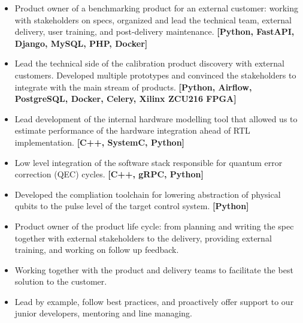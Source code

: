 \documentclass[10pt,a4paper,ragged2e,withhyper]{altacv}
\begin{document}


\begin{itemize}

    \item
    Product owner of a benchmarking product for an external customer:
    working with stakeholders on specs, organized and lead the technical team,
    external delivery, user training, and post-delivery maintenance.
    {\bf [Python, FastAPI, Django, MySQL, PHP, Docker]}
    
    \item
    Lead the technical side of the calibration product discovery with external
    customers.
    Developed multiple prototypes and convinced the stakeholders to integrate
    with the main stream of products.
    {\bf [Python, Airflow, PostgreSQL, Docker, Celery, Xilinx ZCU216 FPGA]}
    
    \item
    Lead development of the internal hardware modelling tool that allowed us
    to estimate performance of the hardware integration ahead of RTL implementation.
    {\bf [C++, SystemC, Python]}

    \item
    Low level integration of the software stack responsible for quantum error
    correction (QEC) cycles.
    {\bf [C++, gRPC, Python]}

    \item
    Developed the compliation toolchain for lowering abstraction of physical
    qubits to the pulse level of the target control system.
    {\bf [Python]}

    \item
    Product owner of the product life cycle: from planning
    and writing the spec together with external stakeholders to the delivery,
    providing external training, and working on follow up feedback.

    \item
    Working together with the product and delivery teams to facilitate the
    best solution to the customer.

    \item
    Lead by example, follow best practices, and proactively offer support to our
    junior developers, mentoring and line managing.

\end{itemize}
\end{document}
